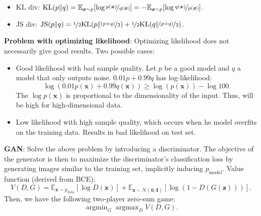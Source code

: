 \documentclass{article}
\DeclareMathOperator*{\argmax}{argmax}
\DeclareMathOperator*{\argmin}{argmin}
\newcommand{\lft}{\mathopen{}\mathclose\bgroup\left}
\newcommand{\rgt}{\aftergroup\egroup\right}
\newcommand{\E}{\mathbb{E}}
\renewcommand{\vec}[1]{\bm{#1}}
\newcommand{\mat}[1]{\bm{#1}}
\newenvironment{topic}[1]
{\textbf{\sffamily \colorbox{black}{\rlap{\textbf{\textcolor{white}{#1}}}\hspace{\linewidth}\hspace{-2\fboxsep}}} \\ \vspace{0.2cm}}
{}
\begin{document}
\begin{multicols*}{2}
\begin{topic}{Normalizing flow}
    \end{topic}

    \begin{topic}{Generative adversarial network}

        \begin{itemize}
            \item KL div: $\mathrm{KL}(p \lVert q) = \E_{\vec{x} \sim p} \lft[ \log \nicefrac{p(\vec{x})}{q(\vec{x})}
                          \rgt] = - \E_{\vec{x} \sim p} \lft[ \log \nicefrac{q(\vec{x})}{p(\vec{x})} \rgt]$.
            \item JS div: $\mathrm{JS}(p \lVert q) = \nicefrac{1}{2} \mathrm{KL}\lft(p \middle\lVert \nicefrac{(p +
                              q)}{2} \rgt) + \nicefrac{1}{2} \mathrm{KL}\lft( q \middle\lVert \nicefrac{(p + q)}{2} \rgt)$.
        \end{itemize}

        \textbf{Problem with optimizing likelihood}: Optimizing likelihood does not necessarily give good results. Two possible cases:
        \begin{itemize}
            \item Good likelihood with bad sample quality. Let $p$ be a good model and $q$ a model that only outputs
                  noise. $0.01p + 0.99q$ has log-likelihood: \[
                      \log(0.01p(\vec{x}) + 0.99q(\vec{x})) \geq \log(p(\vec{x})) - \log 100.
                  \]
                  The $\log p(\vec{x})$ is proportional to the dimensionality of the input. Thus, will be high for
                  high-dimensional data.

            \item Low likelihood with high sample quality, which occurs when he model overfits on the training data.
                  Results in bad likelihood on test set.

        \end{itemize}

        \textbf{GAN}: Solve the above problem by introducing a discriminator. The objective of the
        generator is then to maximize the discriminator's classification loss by generating images
        similar to the training set, implicitly inducing $p_{\mathrm{model}}$. Value function (derived from BCE): \[
            V(D, G) = \E_{\vec{x} \sim p_{\mathrm{data}}}[\log D(\vec{x})] + \E_{\vec{z} \sim \mathcal{N}(\vec{0}, \mat{I})} [\log (1 - D(G(\vec{z})))].
        \]
        Then, we have the following two-player zero-sum game: \[
            \argmin\nolimits_G \argmax\nolimits_D V(D,G).
        \]


\end{topic}
\end{multicols*}
\end{document}
